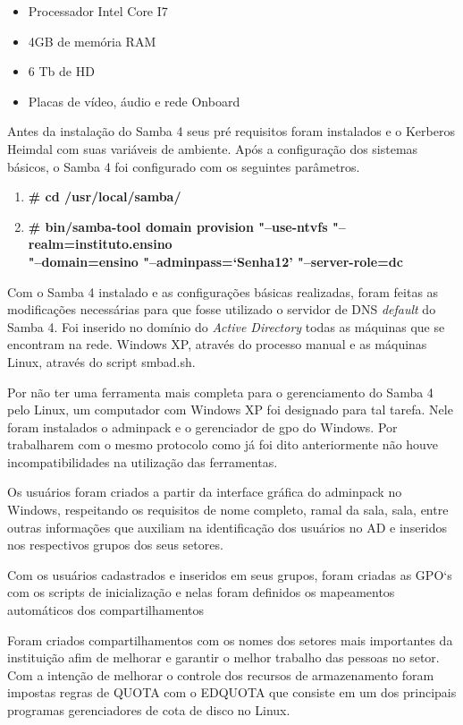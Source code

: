 \begin{itemize}
	\item{Processador Intel Core I7\textregistered}
	\item{4GB de memória RAM}
	\item{6 Tb de HD}
	\item{Placas de vídeo, áudio e rede Onboard}
\end{itemize}

Antes da instalação do Samba 4 seus pré requisitos foram instalados e o Kerberos Heimdal com suas variáveis de ambiente.
Após a configuração dos sistemas básicos, o Samba 4 foi configurado com os seguintes parâmetros.

\begin{enumerate}
	\item \textbf{\# cd /usr/local/samba/}
	\item \textbf{\# bin/samba-tool domain provision "--use-ntvfs "--realm=instituto.ensino\\"--domain=ensino  "--adminpass=`Senha12' "--server-role=dc}
\end{enumerate}

Com o Samba 4 instalado e as configurações básicas realizadas, foram feitas as modificações necessárias para que fosse utilizado o servidor de DNS \textit{default} do Samba 4. Foi inserido no domínio do \textit{Active Directory} todas as máquinas que se encontram na rede. Windows XP, através do processo manual e as máquinas Linux, através do script smbad.sh.

Por não ter uma ferramenta mais completa para o gerenciamento do Samba 4 pelo Linux, um computador com Windows XP foi designado para tal tarefa. Nele foram instalados o adminpack e o gerenciador de gpo do Windows. Por trabalharem com o mesmo protocolo como já foi dito anteriormente não houve incompatibilidades na utilização das ferramentas.

Os usuários foram criados a partir da interface gráfica do adminpack no Windows, respeitando os requisitos de nome completo, ramal da sala, sala, entre outras informações que auxiliam na identificação dos usuários no AD e inseridos nos respectivos grupos dos seus setores.

Com os usuários cadastrados e inseridos em seus grupos, foram criadas as GPO`s com os scripts de inicialização e nelas foram definidos os mapeamentos automáticos dos compartilhamentos

Foram criados compartilhamentos com os nomes dos setores mais importantes da instituição afim de melhorar e garantir o melhor trabalho das pessoas no setor. Com a intenção de melhorar o controle dos recursos de armazenamento foram impostas regras de QUOTA com o EDQUOTA que consiste em um dos principais programas gerenciadores de cota de disco no Linux.

